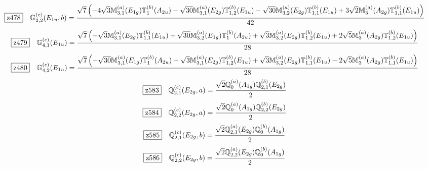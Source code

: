 \documentclass[fleqn,10pt,landscape]{jsarticle}
\begin{document}
\begin{dmath*}
\hspace*{3mm}\fbox{z478}\quad \mathbb{G}_{2,2}^{(c)}(E_{1u},b)=\frac{\sqrt{7} \left(- 4 \sqrt{3} \mathbb{M}_{3,1}^{(a)}(E_{1g}) \mathbb{T}_{1}^{(b)}(A_{2u}) - \sqrt{30} \mathbb{M}_{3,1}^{(a)}(E_{2g}) \mathbb{T}_{1,2}^{(b)}(E_{1u}) - \sqrt{30} \mathbb{M}_{3,2}^{(a)}(E_{2g}) \mathbb{T}_{1,1}^{(b)}(E_{1u}) + 3 \sqrt{2} \mathbb{M}_{3}^{(a)}(A_{2g}) \mathbb{T}_{1,1}^{(b)}(E_{1u})\right)}{42}
\end{dmath*}
\begin{dmath*}
\hspace*{3mm}\fbox{z479}\quad \mathbb{G}_{4,1}^{(c)}(E_{1u})=\frac{\sqrt{7} \left(- \sqrt{3} \mathbb{M}_{3,1}^{(a)}(E_{2g}) \mathbb{T}_{1,1}^{(b)}(E_{1u}) + \sqrt{30} \mathbb{M}_{3,2}^{(a)}(E_{1g}) \mathbb{T}_{1}^{(b)}(A_{2u}) + \sqrt{3} \mathbb{M}_{3,2}^{(a)}(E_{2g}) \mathbb{T}_{1,2}^{(b)}(E_{1u}) + 2 \sqrt{5} \mathbb{M}_{3}^{(a)}(A_{2g}) \mathbb{T}_{1,2}^{(b)}(E_{1u})\right)}{28}
\end{dmath*}
\begin{dmath*}
\hspace*{3mm}\fbox{z480}\quad \mathbb{G}_{4,2}^{(c)}(E_{1u})=\frac{\sqrt{7} \left(- \sqrt{30} \mathbb{M}_{3,1}^{(a)}(E_{1g}) \mathbb{T}_{1}^{(b)}(A_{2u}) + \sqrt{3} \mathbb{M}_{3,1}^{(a)}(E_{2g}) \mathbb{T}_{1,2}^{(b)}(E_{1u}) + \sqrt{3} \mathbb{M}_{3,2}^{(a)}(E_{2g}) \mathbb{T}_{1,1}^{(b)}(E_{1u}) - 2 \sqrt{5} \mathbb{M}_{3}^{(a)}(A_{2g}) \mathbb{T}_{1,1}^{(b)}(E_{1u})\right)}{28}
\end{dmath*}
\begin{dmath*}
\hspace*{3mm}\fbox{z583}\quad \mathbb{Q}_{2,1}^{(c)}(E_{2g},a)=\frac{\sqrt{2} \mathbb{Q}_{0}^{(a)}(A_{1g}) \mathbb{Q}_{2,1}^{(b)}(E_{2g})}{2}
\end{dmath*}
\begin{dmath*}
\hspace*{3mm}\fbox{z584}\quad \mathbb{Q}_{2,2}^{(c)}(E_{2g},a)=\frac{\sqrt{2} \mathbb{Q}_{0}^{(a)}(A_{1g}) \mathbb{Q}_{2,2}^{(b)}(E_{2g})}{2}
\end{dmath*}
\begin{dmath*}
\hspace*{3mm}\fbox{z585}\quad \mathbb{Q}_{2,1}^{(c)}(E_{2g},b)=\frac{\sqrt{2} \mathbb{Q}_{2,1}^{(a)}(E_{2g}) \mathbb{Q}_{0}^{(b)}(A_{1g})}{2}
\end{dmath*}
\begin{dmath*}
\hspace*{3mm}\fbox{z586}\quad \mathbb{Q}_{2,2}^{(c)}(E_{2g},b)=\frac{\sqrt{2} \mathbb{Q}_{2,2}^{(a)}(E_{2g}) \mathbb{Q}_{0}^{(b)}(A_{1g})}{2}
\end{dmath*}
\end{document}
